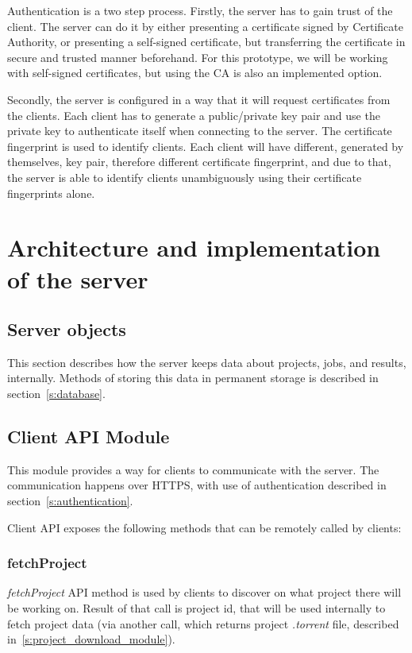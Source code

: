 Authentication is a two step process. Firstly, the server has to gain trust of the client. The server can do it by either presenting a certificate signed by Certificate Authority, or presenting a self-signed certificate, but transferring the certificate in secure and trusted manner beforehand. For this prototype, we will be working with self-signed certificates, but using the CA is also an implemented option.

Secondly, the server is configured in a way that it will request certificates from the clients. Each client has to generate a public/private key pair and use the private key to authenticate itself when connecting to the server. The certificate fingerprint is used to identify clients. Each client will have different, generated by themselves, key pair, therefore different certificate fingerprint, and due to that, the server is able to identify clients unambiguously using their certificate fingerprints alone.

\section{Architecture and implementation of the server}

\subsection{Server objects}

This section describes how the server keeps data about projects, jobs, and results, internally. Methods of storing this data in permanent storage is described in section~\ref{s:database}.

\subsection{Client API Module}
\label{s:cliapi}

This module provides a way for clients to communicate with the server. The communication happens over HTTPS, with use of authentication described in section~\ref{s:authentication}.

Client API exposes the following methods that can be remotely called by clients:

\subsubsection*{fetchProject}

\emph{fetchProject} API method is used by clients to discover on what project there will be working on. Result of that call is project id, that will be used internally to fetch project data (via another call, which returns project \emph{.torrent} file, described in~\ref{s:project_download_module}).

